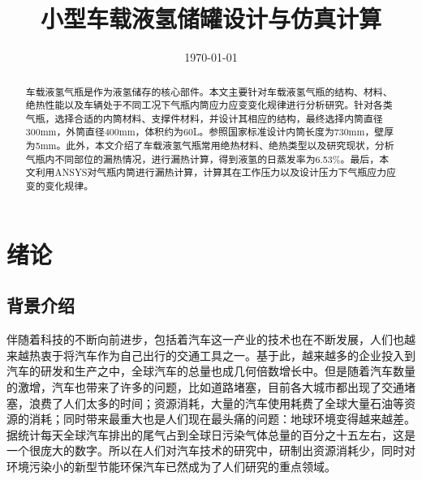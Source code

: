 \documentclass[UTF8,a4paper]{ctexart}
\title{\textbf{小型车载液氢储罐设计与仿真计算}}
\author{}
\date{\today}
\begin{document}
	\titleformat{\section}{\huge\bfseries}{\thesection}{1em}{}
	\titleformat{\subsection}{\Large\bfseries}{\thesubsection}{1em}{}
	\titleformat{\subsubsection}{\Large\bfseries}{\thesubsubsection}{1em}{}
	\titleformat{\subsubsection}{\Large\bfseries}{\thesubsubsection}{1em}{}
	\maketitle
	
	\newpage
	\tableofcontents
	
	\newpage
	\clearpage
	\begin{abstract}
		车载液氢气瓶是作为液氢储存的核心部件。本文主要针对车载液氢气瓶的结构、材料、绝热性能以及车辆处于不同工况下气瓶内筒应力应变变化规律进行分析研究。针对各类气瓶，选择合适的内筒材料、支撑件材料，并设计其相应的结构，最终选择内筒直径300mm，外筒直径400mm，体积约为60L。参照国家标准设计内筒长度为730mm，壁厚为5mm。此外，本文介绍了车载液氢气瓶常用绝热材料、绝热类型以及研究现状，分析气瓶内不同部位的漏热情况，进行漏热计算，得到液氢的日蒸发率为6.53\%。最后，本文利用ANSYS对气瓶内筒进行漏热计算，计算其在工作压力以及设计压力下气瓶应力应变的变化规律。
		
	\end{abstract}
	
	\newpage
	\section{绪论}
	\subsection{背景介绍}
	伴随着科技的不断向前进步，包括着汽车这一产业的技术也在不断发展，人们也越来越热衷于将汽车作为自己出行的交通工具之一。基于此，越来越多的企业投入到汽车的研发和生产之中，全球汽车的总量也成几何倍数增长中。但是随着汽车数量的激增，汽车也带来了许多的问题，比如道路堵塞，目前各大城市都出现了交通堵塞，浪费了人们太多的时间；资源消耗，大量的汽车使用耗费了全球大量石油等资源的消耗；同时带来最重大也是人们现在最头痛的问题：地球环境变得越来越差。据统计每天全球汽车排出的尾气占到全球日污染气体总量的百分之十五左右，这是一个很庞大的数字。所以在人们对汽车技术的研究中，研制出资源消耗少，同时对环境污染小的新型节能环保汽车已然成为了人们研究的重点领域。
	
\end{document}
